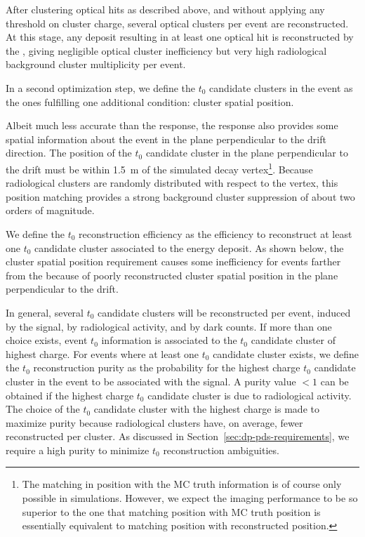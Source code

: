 After clustering optical hits as described above, and without applying any threshold on cluster charge, several optical clusters per event are reconstructed. At this stage, any deposit resulting in at least one optical hit is reconstructed by the , giving negligible  optical cluster inefficiency but very high radiological background cluster multiplicity per event. 

In a second optimization step, we define the $t_0$ candidate clusters in the event as the ones fulfilling one additional condition: cluster spatial position.

Albeit much less accurate than the  response, the  response also provides some spatial information about the event in the plane perpendicular to the drift direction. The position of the $t_0$ candidate cluster in the plane perpendicular to the drift must be within \SI{1.5}{\m} of the simulated  decay vertex\footnote{The matching in position with the MC truth information is of course only possible in simulations. However, we expect the  imaging performance to be so superior to the  one that matching  position with MC truth position is essentially equivalent to matching  position with  reconstructed position.}. Because radiological clusters are randomly distributed with respect to the  vertex, this position matching provides a strong background cluster suppression of about two orders of magnitude.

We define the  $t_0$ reconstruction efficiency as the efficiency to reconstruct at least one $t_0$ candidate cluster associated to the  energy deposit. As shown below, the cluster spatial position requirement causes some inefficiency for events farther from the  because of poorly reconstructed cluster spatial position in the plane perpendicular to the drift.


In general, several $t_0$ candidate clusters will be reconstructed per event, induced by the  signal, by radiological activity, and by  dark counts. If more than one choice exists, event $t_0$ information is associated to the $t_0$ candidate cluster of highest charge. For events where at least one $t_0$ candidate cluster exists, we define the   $t_0$ reconstruction purity as the probability for the highest charge $t_0$ candidate cluster in the event to be associated with the  signal. A purity value $<1$ can be obtained if the highest charge $t_0$ candidate cluster is due to radiological activity. The choice of the $t_0$ candidate cluster with the highest charge is made to maximize purity because radiological clusters have, on average, fewer reconstructed  per cluster. As discussed in Section~\ref{sec:dp-pds-requirements}, we require a high purity to minimize $t_0$ reconstruction ambiguities.
%

